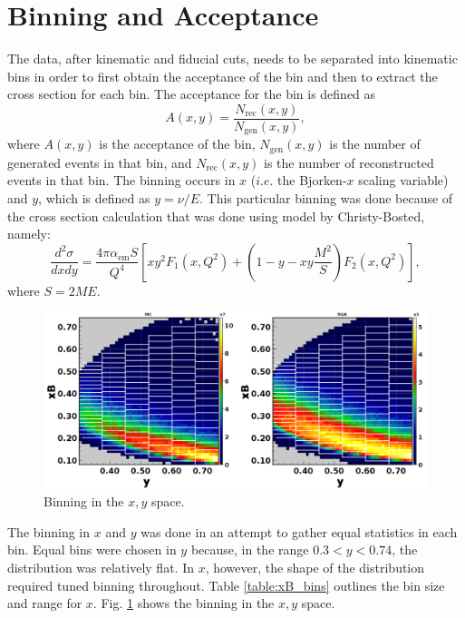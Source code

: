 \cleardoublepage
\section{Binning and Acceptance}
The data, after kinematic and fiducial cuts, needs to be separated into kinematic bins in order to first obtain the acceptance of the bin and then to extract the cross section for each bin. The acceptance for the bin is defined as
\begin{equation}
A(x,y) = \frac{N_{\mathrm{rec}}(x,y)}{N_{\mathrm{gen}}(x,y)},
\end{equation}
where $A(x,y)$ is the acceptance of the bin, $N_{\mathrm{gen}}(x,y)$ is the number of generated events in that bin, and $N_{\mathrm{rec}}(x,y)$ is the number of reconstructed events in that bin. The binning occurs in $x$ ($i.e.$ the Bjorken-$x$ scaling variable) and $y$, which is defined as $y = \nu/E$. This particular binning was done because of the cross section calculation that was done using model by Christy-Bosted, namely:
\begin{equation}
\label{eq:dis_xsec}
\frac{d^2\sigma}{dxdy} = \frac{4\pi\alpha_{\mathrm{em}}S}{Q^4} \left[ xy^2 F_1(x,Q^2) + \left( 1-y-xy\frac{M^2}{S} \right) F_2(x,Q^2) \right],
\end{equation}
where $S = 2ME$.

\begin{figure}[h!]
	\centering
	\includegraphics[width=0.9\linewidth]{figures/rga/xB_vs_y_bins.png}
	\caption{Binning in the $x,y$ space.}
	\label{fig:xb_vs_y_bins}
\end{figure}

The binning in $x$ and $y$ was done in an attempt to gather equal statistics in each bin. Equal bins were chosen in $y$ because, in the range $0.3 < y < 0.74$, the distribution was relatively flat. In $x$, however, the shape of the distribution required tuned binning throughout. Table \ref{table:xB_bins} outlines the bin size and range for $x$. Fig. \ref{fig:xb_vs_y_bins} shows the binning in the $x,y$ space. 

